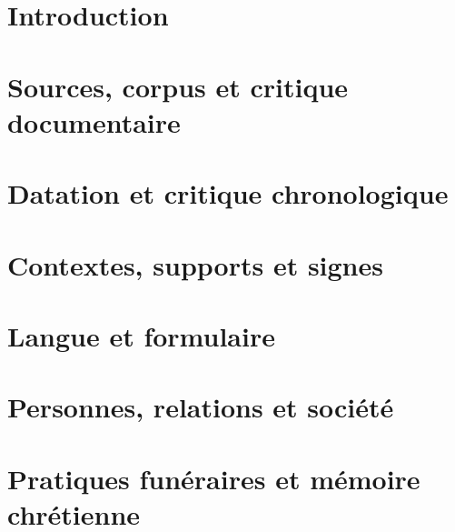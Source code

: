 \documentclass[11pt,twoside,openright]{book}
\begin{document}
\frontmatter


\tableofcontents
\listoftables
\listoffigures

\mainmatter
\part{Introduction}




\part{Sources, corpus et critique documentaire}




\part{Datation et critique chronologique}






\part{Contextes, supports et signes}



\part{Langue et formulaire}






\part{Personnes, relations et société}





\part{Pratiques funéraires et mémoire chrétienne}









\end{document}
